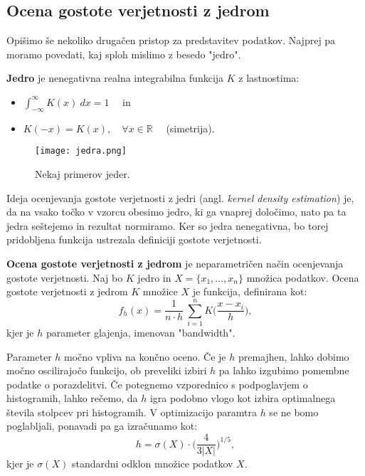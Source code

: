 \subsection{Ocena gostote verjetnosti z jedrom}
Opišimo še nekoliko drugačen pristop za predstavitev podatkov. Najprej pa moramo povedati, kaj sploh mislimo z besedo "jedro".
\begin{definicija}
    \textbf{Jedro} je nenegativna realna integrabilna funkcija $K$ z lastnostima:
    \begin{itemize}
        \item $\int_{-\infty}^\infty K(x) \  dx = 1 \quad$ in
		\item $K(-x) = K(x), \quad \forall x \in \mathbb{R} \quad$ (simetrija).
    \end{itemize}
\end{definicija}

\begin{figure}[!h]
    \centering
    \texttt{[image: jedra.png]}
    \caption{Nekaj primerov jeder.}
    \label{jedra}
\end{figure}

Ideja ocenjevanja gostote verjetnosti z jedri (angl. \textit{kernel density estimation}) je, da na vsako točko v vzorcu obesimo jedro, ki ga vnaprej določimo, nato pa ta jedra seštejemo in rezultat normiramo. Ker so jedra nenegativna, bo torej pridobljena funkcija ustrezala definiciji gostote verjetnosti.
\begin{definicija}
    \textbf{Ocena gostote verjetnosti z jedrom} je neparametričen način ocenjevanja gostote verjetnosti. Naj bo $K$ jedro in $X = \{x_1,\ldots,x_n\}$ množica podatkov.  Ocena gostote verjetnosti z jedrom $K$ množice $X$ je funkcija, definirana kot:
    \begin{equation}
        f_h(x) = \frac{1}{n\cdot h} \  \sum_{i=1}^n K\Big(\frac{x - x_i}{h}\Big),
    \end{equation}
    kjer je $h$ parameter glajenja, imenovan "bandwidth". %
\end{definicija}

Parameter $h$ močno vpliva na končno oceno. Če je $h$ premajhen, lahko dobimo močno oscilirajočo funkcijo, ob preveliki izbiri $h$ pa lahko izgubimo pomembne podatke o porazdelitvi. Če potegnemo vzporednico s podpoglavjem o histogramih, lahko rečemo, da $h$ igra podobno vlogo kot izbira optimalnega števila stolpcev pri histogramih. V optimizacijo paramtra $h$ se ne bomo poglabljali, ponavadi pa ga izračunamo kot:
\begin{equation}
    h = \sigma(X) \cdot \Big(\frac{4}{3|X|}\Big)^{1/5},
\end{equation}
kjer je $\sigma(X)$ standardni odklon množice podatkov $X$.

